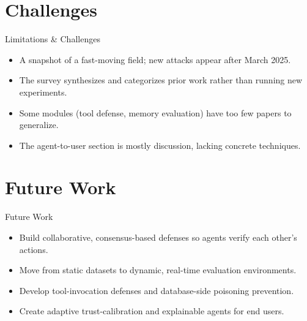 \documentclass[10pt]{beamer}
\begin{document}
\section{Challenges}
\begin{frame}{Limitations \& Challenges}
\begin{itemize}
  \item A snapshot of a fast-moving field; new attacks appear after March 2025.
  \item The survey synthesizes and categorizes prior work rather than running new experiments.
  \item Some modules (tool defense, memory evaluation) have too few papers to generalize.
  \item The agent-to-user section is mostly discussion, lacking concrete techniques.
\end{itemize}
\end{frame}
\section{Future Work}
\begin{frame}{Future Work}
\begin{itemize}
  \item Build collaborative, consensus-based defenses so agents verify each other's actions.
  \item Move from static datasets to dynamic, real-time evaluation environments.
  \item Develop tool-invocation defenses and database-side poisoning prevention.
  \item Create adaptive trust-calibration and explainable agents for end users.
\end{itemize}
\end{frame}
\end{document}
